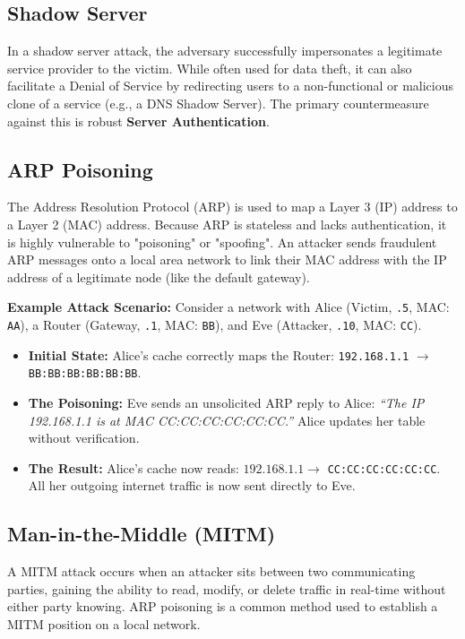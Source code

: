 \subsection{Shadow Server}
In a shadow server attack, the adversary successfully impersonates a legitimate service provider to the victim. While often used for data theft, it can also facilitate a Denial of Service by redirecting users to a non-functional or malicious clone of a service (e.g., a DNS Shadow Server). The primary countermeasure against this is robust \textbf{Server Authentication}.

\subsection{ARP Poisoning}
The Address Resolution Protocol (ARP) is used to map a Layer 3 (IP) address to a Layer 2 (MAC) address. Because ARP is stateless and lacks authentication, it is highly vulnerable to "poisoning" or "spoofing". An attacker sends fraudulent ARP messages onto a local area network to link their MAC address with the IP address of a legitimate node (like the default gateway).

\textbf{Example Attack Scenario:}
Consider a network with Alice (Victim, \texttt{.5}, MAC: \texttt{AA}), a Router (Gateway, \texttt{.1}, MAC: \texttt{BB}), and Eve (Attacker, \texttt{.10}, MAC: \texttt{CC}).
\begin{itemize}
    \item \textbf{Initial State:} Alice's cache correctly maps the Router: \texttt{192.168.1.1} $\rightarrow$ \texttt{BB:BB:BB:BB:BB:BB}.
    \item \textbf{The Poisoning:} Eve sends an unsolicited ARP reply to Alice: \textit{``The IP 192.168.1.1 is at MAC CC:CC:CC:CC:CC:CC.''} Alice updates her table without verification.
    \item \textbf{The Result:} Alice's cache now reads: $192.168.1.1 \rightarrow$ \texttt{CC:CC:CC:CC:CC:CC}. All her outgoing internet traffic is now sent directly to Eve.
\end{itemize}

\subsection{Man-in-the-Middle (MITM)}
A MITM attack occurs when an attacker sits between two communicating parties, gaining the ability to read, modify, or delete traffic in real-time without either party knowing. ARP poisoning is a common method used to establish a MITM position on a local network.

